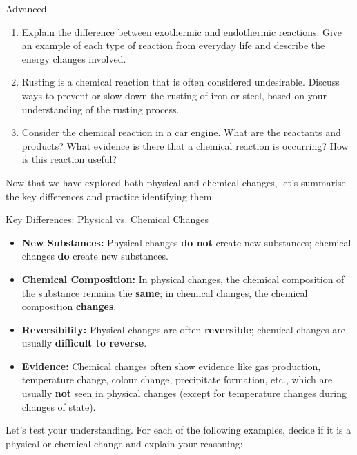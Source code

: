 \begin{tieredquestions}{Advanced}
\begin{enumerate}
    \item  Explain the difference between exothermic and endothermic reactions. Give an example of each type of reaction from everyday life and describe the energy changes involved.
    \item  Rusting is a chemical reaction that is often considered undesirable. Discuss ways to prevent or slow down the rusting of iron or steel, based on your understanding of the rusting process.
    \item  Consider the chemical reaction in a car engine. What are the reactants and products? What evidence is there that a chemical reaction is occurring? How is this reaction useful?
\end{enumerate}
\end{tieredquestions}


\FloatBarrier
\1

Now that we have explored both physical and chemical changes, let's summarise the key differences and practice identifying them.

\begin{keyconcept}{Key Differences: Physical vs. Chemical Changes}
\begin{itemize}
    \item \textbf{New Substances:} Physical changes \textbf{do not} create new substances; chemical changes \textbf{do} create new substances.
    \item \textbf{Chemical Composition:} In physical changes, the chemical composition of the substance remains the \textbf{same}; in chemical changes, the chemical composition \textbf{changes}.
    \item \textbf{Reversibility:} Physical changes are often \textbf{reversible}; chemical changes are usually \textbf{difficult to reverse}.
    \item \textbf{Evidence:} Chemical changes often show evidence like gas production, temperature change, colour change, precipitate formation, etc., which are usually \textbf{not} seen in physical changes (except for temperature changes during changes of state).
\end{itemize}
\end{keyconcept}

Let's test your understanding. For each of the following examples, decide if it is a physical or chemical change and explain your reasoning:

